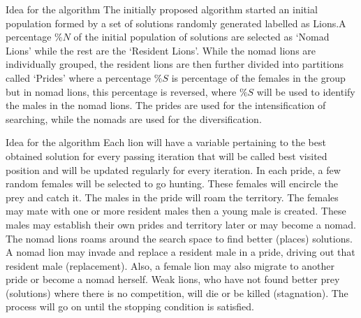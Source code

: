 \documentclass{beamer}
\begin{document}
\begin{frame}{Idea for the algorithm}
The initially proposed algorithm started an initial population formed by a set of solutions randomly generated labelled as Lions.A percentage $\%N$ of the initial population of solutions are selected as `Nomad Lions' while the rest are the `Resident Lions'. While the nomad lions are individually grouped, the resident lions are then further divided into partitions called `Prides' where a percentage $\%S$ is percentage of the females in the group but in nomad lions, this percentage is reversed, where $\%S$ will be used to identify the males in the nomad lions. The prides are used for the intensification of searching, while the nomads are used for the diversification.
\end{frame}
\begin{frame}{Idea for the algorithm}
Each lion will have a variable pertaining to the best obtained solution for every passing iteration that will be called best visited position and will be updated regularly for every iteration. In each pride, a few random females will be selected to go hunting. These females will encircle the prey and catch it. The males in the pride will roam the territory. The females may mate with one or more resident males then a young male is created. These males may establish their own prides and territory later or may become a nomad.
The nomad lions roams around the search space to find better (places) solutions. A nomad lion may invade and replace a resident male in a pride, driving out that resident male (replacement). Also, a female lion may also migrate to another pride or become a nomad herself. Weak lions, who have not found better prey (solutions) where there is no competition, will die or be killed (stagnation). The process will go on until the stopping condition is satisfied.
\end{frame}


\end{document}

